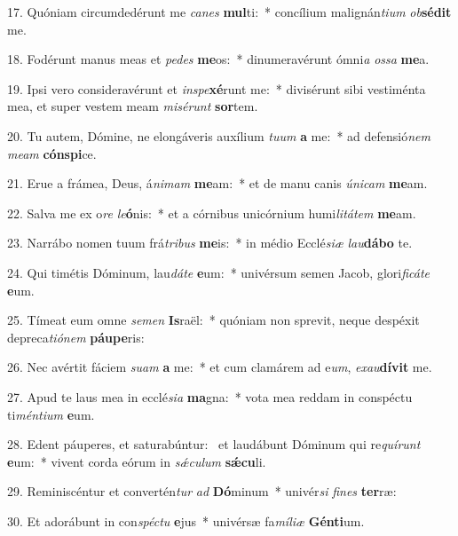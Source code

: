 17. Quóniam circumdedérunt me \textit{ca}\textit{nes} \textbf{mul}ti:~*  concílium malignán\textit{ti}\textit{um} \textit{ob}\textbf{sé}\textbf{dit} me.\

18. Fodérunt manus meas et \textit{pe}\textit{des} \textbf{me}os:~*  dinumeravérunt ómni\textit{a} \textit{os}\textit{sa} \textbf{me}a.\

19. Ipsi vero consideravérunt et \textit{in}\textit{spe}\textbf{xé}runt me:~*  divisérunt sibi vestiménta mea, et super vestem meam \textit{mi}\textit{sé}\textit{runt} \textbf{sor}tem.\

20. Tu autem, Dómine, ne elongáveris auxílium \textit{tu}\textit{um} \textbf{a} me:~*  ad defensió\textit{nem} \textit{me}\textit{am} \textbf{cón}\textbf{spi}ce.\

21. Erue a frámea, Deus, á\textit{ni}\textit{mam} \textbf{me}am:~*  et de manu canis \textit{ú}\textit{ni}\textit{cam} \textbf{me}am.\

22. Salva me ex o\textit{re} \textit{le}\textbf{ó}nis:~*  et a córnibus unicórnium humi\textit{li}\textit{tá}\textit{tem} \textbf{me}am.\

23. Narrábo nomen tuum frá\textit{tri}\textit{bus} \textbf{me}is:~*  in médio Ecclé\textit{si}\textit{æ} \textit{lau}\textbf{dá}\textbf{bo} te.\

24. Qui timétis Dóminum, lau\textit{dá}\textit{te} \textbf{e}um:~*  univérsum semen Jacob, glori\textit{fi}\textit{cá}\textit{te} \textbf{e}um.\

25. Tímeat eum omne \textit{se}\textit{men} \textbf{Is}raël:~*  quóniam non sprevit, neque despéxit depreca\textit{ti}\textit{ó}\textit{nem} \textbf{páu}\textbf{pe}ris:\

26. Nec avértit fáciem \textit{su}\textit{am} \textbf{a} me:~*  et cum clamárem ad e\textit{um}, \textit{ex}\textit{au}\textbf{dí}\textbf{vit} me.\

27. Apud te laus mea in ecclé\textit{si}\textit{a} \textbf{ma}gna:~*  vota mea reddam in conspéctu ti\textit{mén}\textit{ti}\textit{um} \textbf{e}um.\

28. Edent páuperes, et saturabúntur: \dag\  et laudábunt Dóminum qui re\textit{quí}\textit{runt} \textbf{e}um:~*  vivent corda eórum in \textit{sǽ}\textit{cu}\textit{lum} \textbf{sǽ}\textbf{cu}li.\

29. Reminiscéntur et convertén\textit{tur} \textit{ad} \textbf{Dó}minum~*  univér\textit{si} \textit{fi}\textit{nes} \textbf{ter}ræ:\

30. Et adorábunt in con\textit{spéc}\textit{tu} \textbf{e}jus~*  univérsæ fa\textit{mí}\textit{li}\textit{æ} \textbf{Gén}\textbf{ti}um.\

